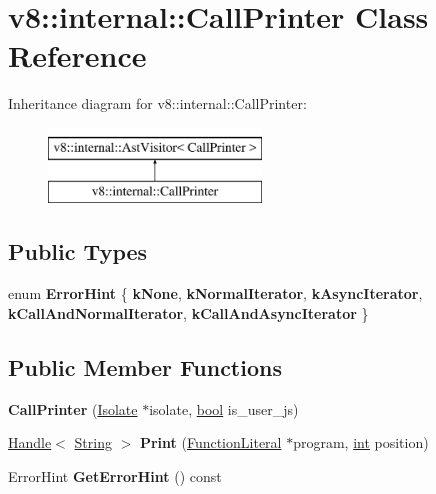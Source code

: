 \hypertarget{classv8_1_1internal_1_1CallPrinter}{}\section{v8\+:\+:internal\+:\+:Call\+Printer Class Reference}
\label{classv8_1_1internal_1_1CallPrinter}
Inheritance diagram for v8\+:\+:internal\+:\+:Call\+Printer\+:\begin{figure}[H]
\begin{center}
\leavevmode
\includegraphics[height=2.000000cm]{classv8_1_1internal_1_1CallPrinter}
\end{center}
\end{figure}
\subsection*{Public Types}
\begin{DoxyCompactItemize}
\item 
\mbox{\label{classv8_1_1internal_1_1CallPrinter_a65b31dd90a092fdf181cf514cb9e10d1}} 
enum {\bfseries Error\+Hint} \{ \newline
{\bfseries k\+None}, 
{\bfseries k\+Normal\+Iterator}, 
{\bfseries k\+Async\+Iterator}, 
{\bfseries k\+Call\+And\+Normal\+Iterator}, 
\newline
{\bfseries k\+Call\+And\+Async\+Iterator}
 \}
\end{DoxyCompactItemize}
\subsection*{Public Member Functions}
\begin{DoxyCompactItemize}
\item 
\mbox{\label{classv8_1_1internal_1_1CallPrinter_ae9c224e25ababe9dcd27683f13c2b9fc}} 
{\bfseries Call\+Printer} (\mbox{\hyperlink{classv8_1_1internal_1_1Isolate}{Isolate}} $\ast$isolate, \mbox{\hyperlink{classbool}{bool}} is\+\_\+user\+\_\+js)
\item 
\mbox{\label{classv8_1_1internal_1_1CallPrinter_a33c0c22ca05b702626b7139f09e7f053}} 
\mbox{\hyperlink{classv8_1_1internal_1_1Handle}{Handle}}$<$ \mbox{\hyperlink{classv8_1_1internal_1_1String}{String}} $>$ {\bfseries Print} (\mbox{\hyperlink{classv8_1_1internal_1_1FunctionLiteral}{Function\+Literal}} $\ast$program, \mbox{\hyperlink{classint}{int}} position)
\item 
\mbox{\label{classv8_1_1internal_1_1CallPrinter_a4990f126a25afdcffc3922a7c2493588}} 
Error\+Hint {\bfseries Get\+Error\+Hint} () const
\end{DoxyCompactItemize}
